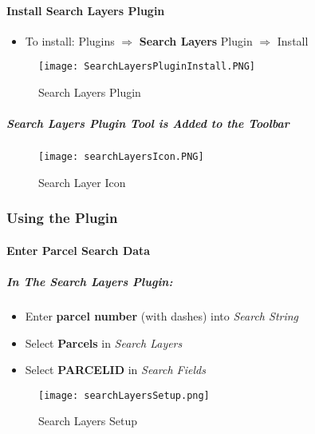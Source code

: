 \paragraph{Install Search Layers Plugin}
\vspace{.2in}

\vspace{.2in}

\begin{itemize}
\item To install: Plugins $\Rightarrow$ \textbf{Search Layers} Plugin $\Rightarrow$ Install
\end{itemize}
\begin{figure}[H]
\centering
     \texttt{[image: SearchLayersPluginInstall.PNG]}

\caption{Search Layers Plugin}
\end{figure}

\subparagraph{Search Layers Plugin Tool is Added to the Toolbar}
\begin{figure}[H]
\centering
     \texttt{[image: searchLayersIcon.PNG]}

\caption{Search Layer Icon}
\end{figure}

\clearpage

\subsubsection{Using the Plugin}

\paragraph*{Enter Parcel Search Data}
\vspace{.2in}

\subparagraph*{In The \textbf{Search Layers Plugin:}}
\vspace{.15in}

\begin{itemize}
\item Enter \textbf{parcel number} {\tiny (with dashes)} into \emph{Search String}
\item Select \textbf{Parcels} in \emph{Search Layers}
\item Select \textbf{PARCELID} in \emph{Search Fields}
\end{itemize}
\begin{figure}[H]
\centering
    \texttt{[image: searchLayersSetup.png]}
\vspace{-.1in}

\caption{Search Layers Setup}
\end{figure}

